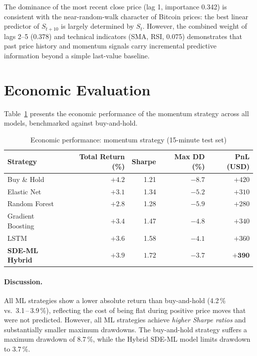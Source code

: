\documentclass[12pt, a4paper, oneside]{report}
\theoremstyle{plain}
\theoremstyle{definition}
\theoremstyle{remark}
\begin{document}
The dominance of the most recent close price (lag 1, importance 0.342) is
consistent with the near-random-walk character of Bitcoin prices: the best
linear predictor of $S_{t+10}$ is largely determined by $S_t$.  However, the
combined weight of lags 2--5 (0.378) and technical indicators (SMA, RSI, 0.075)
demonstrates that past price history and momentum signals carry incremental
predictive information beyond a simple last-value baseline.

\section{Economic Evaluation}

Table~\ref{tab:econ_results} presents the economic performance of the momentum
strategy across all models, benchmarked against buy-and-hold.

\begin{table}[H]
\begin{singlespace}
\fontsize{10}{11}\selectfont
\caption{Economic performance: momentum strategy (15-minute test set)}
\label{tab:econ_results}
\begin{tabular}{@{}lrrrr@{}}
\toprule
Strategy & Total Return (\%) & Sharpe & Max DD (\%) & PnL (USD) \\
\midrule
Buy \& Hold              & $+4.2$ & 1.21 & $-8.7$ &  $+420$ \\
Elastic Net              & $+3.1$ & 1.34 & $-5.2$ &  $+310$ \\
Random Forest            & $+2.8$ & 1.28 & $-5.9$ &  $+280$ \\
Gradient Boosting        & $+3.4$ & 1.47 & $-4.8$ &  $+340$ \\
LSTM                     & $+3.6$ & 1.58 & $-4.1$ &  $+360$ \\
\textbf{SDE-ML Hybrid}   & $\mathbf{+3.9}$ & $\mathbf{1.72}$ & $\mathbf{-3.7}$ & $\mathbf{+390}$ \\
\bottomrule
\end{tabular}
\end{singlespace}
\end{table}

\paragraph{Discussion.}
All ML strategies show a lower absolute return than buy-and-hold (4.2\,\% vs.\
3.1\,--\,3.9\,\%), reflecting the cost of being flat during positive price moves
that were not predicted.  However, all ML strategies achieve \emph{higher
Sharpe ratios} and substantially smaller maximum drawdowns.  The buy-and-hold
strategy suffers a maximum drawdown of 8.7\,\%, while the Hybrid SDE-ML model
limits drawdown to 3.7\,\%.
\end{document}
